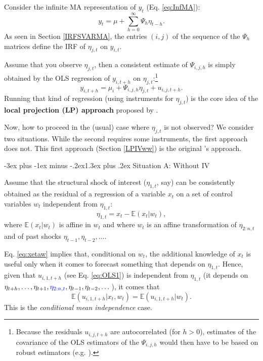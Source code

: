 \documentclass[
  11pt,
]{book}
\makeatletter
\renewcommand\section{\@startsection{section}{1}{\z@}
  {-3ex plus -1ex minus -.2ex}{1.3ex plus .2ex}
  {\normalfont\Large\bfseries\color{TextbookInk}}}
\theoremstyle{definition}
\theoremstyle{definition}
\theoremstyle{definition}
\theoremstyle{definition}
\theoremstyle{remark}
\makeatother
\begin{document}
Consider the infinite MA representation of \(y_t\) (Eq. \eqref{eq:InfMA}):
\[
y_t = \mu + \sum_{h=0}^\infty \Psi_{h} \eta_{t-h}.
\]
As seen in Section \ref{IRFSVARMA}, the entries \((i,j)\) of the sequence of the \(\Psi_h\) matrices define the IRF of \(\eta_{j,t}\) on \(y_{i,t}\).

Assume that you observe \(\eta_{j,t}\), then a consistent estimate of \(\Psi_{i,j,h}\) is simply obtained by the OLS regression of \(y_{i,t+h}\) on \(\eta_{j,t}\):\footnote{Because the residuals \(u_{i,j,t+h}\) are autocorrelated (for \(h>0\)), estimates of the covariance of the OLS estimators of the \(\Psi_{i,j,h}\) would then have to be based on robust estimators (e.g. \citet{Newey_West_1987}).}
\begin{equation}
y_{i,t+h} = \mu_i + \Psi_{i,j,h}\eta_{j,t} + u_{i,j,t+h}.\label{eq:OLS1}
\end{equation}
Running that kind of regression (using instruments for \(\eta_{j,t}\)) is the core idea of the \textbf{local projection (LP) approach} proposed by \citet{Jorda_2005}.

Now, how to proceed in the (usual) case where \(\eta_{j,t}\) is not observed? We consider two situations. While the second requires some instruments, the first approach does not. This first approach (Section \ref{LPIVww}) is the original \citet{Jorda_2005}'s approach.

\section{Situation A: Without IV}\label{LPIVww}

Assume that the structural shock of interest (\(\eta_{1,t}\), say) can be consistently obtained as the residual of a regression of a variable \(x_t\) on a set of control variables \(w_t\) independent from \(\eta_{1,t}\):
\begin{equation}
\eta_{1,t} = x_t - \mathbb{E}(x_t|w_t),\label{eq:xetaw}
\end{equation}
where \(\mathbb{E}(x_t|w_t)\) is affine in \(w_t\) and where \(w_t\) is an affine transformation of \(\eta_{2:n,t}\) and of past shocks \(\eta_{t-1},\eta_{t-2},\dots\).

Eq. \eqref{eq:xetaw} implies that, conditional on \(w_t\), the additional knowledge of \(x_t\) is useful only when it comes to forecast something that depends on \(\eta_{1,t}\). Hence, given that \(u_{i,1,t+h}\) (see Eq. \eqref{eq:OLS1}) is independent from \(\eta_{1,t}\) (it depends on \(\eta_{t+h},\dots,\eta_{t+1},{\color{blue}\eta_{2:n,t}},\eta_{t-1},\eta_{t-2},\dots\)), it comes that
\begin{equation}
\mathbb{E}(u_{i,1,t+h}|x_t,w_t)= \mathbb{E}(u_{i,1,t+h}|w_t).\label{eq:uuuIV}
\end{equation}
This is the \emph{conditional mean independence} case.
\end{document}
